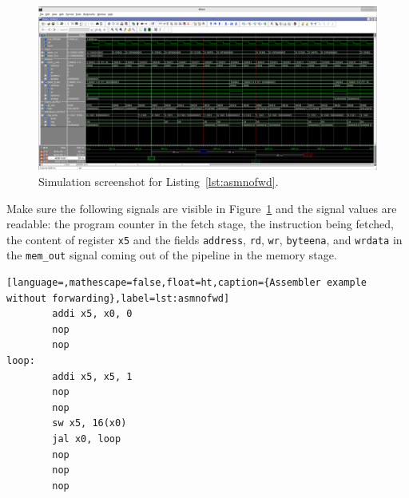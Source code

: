 \documentclass[11pt,a4paper,titlepage,oneside]{article}
\begin{document}
\maketitle


\begin{figure}[ht!]
  \centering
  \includegraphics[width=1.0\linewidth]{pipeline.png}
  \caption{Simulation screenshot for Listing~\ref{lst:asmnofwd}.}
  \label{fig:sim}
\end{figure}

Make sure the following signals are visible in Figure~\ref{fig:sim} and the 
signal values are readable:
the program counter in the fetch stage, the instruction being fetched, the 
content of register \texttt{x5} and the fields \texttt{address}, \texttt{rd}, 
\texttt{wr}, \texttt{byteena}, and \texttt{wrdata} in the \texttt{mem\_out} 
signal coming out of the pipeline in the memory stage.

\begin{lstlisting}[language=,mathescape=false,float=ht,caption={Assembler example without forwarding},label=lst:asmnofwd]
        addi x5, x0, 0
        nop
        nop
loop:
        addi x5, x5, 1
        nop
        nop
        sw x5, 16(x0)
        jal x0, loop
        nop
        nop
        nop
\end{lstlisting}
\end{document}
